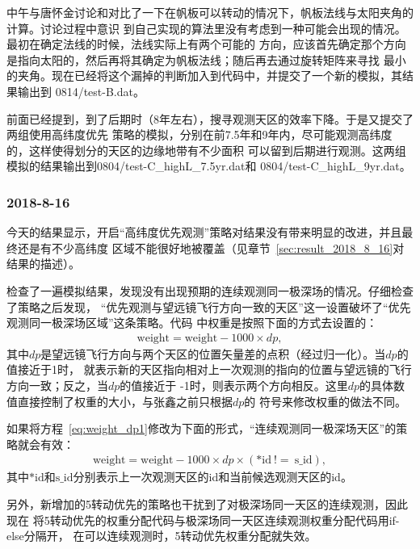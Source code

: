 \documentclass[a4paper,11pt]{ctexart}
\begin{document}
中午与唐怀金讨论和对比了一下在帆板可以转动的情况下，帆板法线与太阳夹角的计算。讨论过程中意识
到自己实现的算法里没有考虑到一种可能会出现的情况。最初在确定法线的时候，法线实际上有两个可能的
方向，应该首先确定那个方向是指向太阳的，然后再将其确定为帆板法线；随后再去通过旋转矩阵来寻找
最小的夹角。现在已经将这个漏掉的判断加入到代码中，并提交了一个新的模拟，其结果输出到
0814/test-B.dat。

前面已经提到，到了后期时（8年左右），搜寻观测天区的效率下降。于是又提交了两组使用高纬度优先
策略的模拟，分别在前7.5年和9年内，尽可能观测高纬度的，这样使得划分的天区的边缘地带有不少面积
可以留到后期进行观测。这两组模拟的结果输出到0804/test-C\_highL\_7.5yr.dat和
0804/test-C\_highL\_9yr.dat。


\subsubsection{2018-8-16} \label{sec:analysis_2018_8_16}

今天的结果显示，开启“高纬度优先观测”策略对结果没有带来明显的改进，并且最终还是有不少高纬度
区域不能很好地被覆盖（见章节~\ref{sec:result_2018_8_16}对结果的描述）。

检查了一遍模拟结果，发现没有出现预期的连续观测同一极深场的情况。仔细检查了策略之后发现，
“优先观测与望远镜飞行方向一致的天区”这一设置破坏了“优先观测同一极深场区域”这条策略。代码
中权重是按照下面的方式去设置的：
\begin{eqnarray}
\text{weight} = \text{weight} - 1000\times dp,
\label{eq:weight_dp1}
\end{eqnarray}
其中$dp$是望远镜飞行方向与两个天区的位置矢量差的点积（经过归一化）。当$dp$的值接近于1时，
就表示新的天区指向相对上一次观测的指向的位置与望远镜的飞行方向一致；反之，当$dp$的值接近于
-1时，则表示两个方向相反。这里$dp$的具体数值直接控制了权重的大小，与张鑫之前只根据$dp$的
符号来修改权重的做法不同。

如果将方程~\eqref{eq:weight_dp1}修改为下面的形式，“连续观测同一极深场天区”的策略就会有效：
\begin{eqnarray}
\text{weight} = \text{weight} - 1000\times dp\times (*\text{id} ~!= ~\text{s\_id}),
\label{eq:weight_dp2}
\end{eqnarray}
其中$*\text{id}$和$\text{s\_id}$分别表示上一次观测天区的id和当前候选观测天区的id。

另外，新增加的5\textdegree 转动优先的策略也干扰到了对极深场同一天区的连续观测，因此现在
将5\textdegree 转动优先的权重分配代码与极深场同一天区连续观测权重分配代码用if-else分隔开，
在可以连续观测时，5\textdegree 转动优先权重分配就失效。
\end{document}
